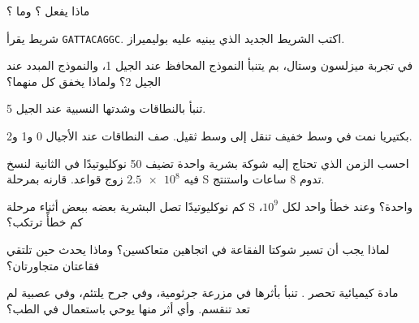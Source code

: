 \begin{exercise}[$\star$]\label{exo:g11:dna-replication:4}
ماذا يفعل ؟ وما ؟
\end{exercise}

\begin{exercise}[$\star$]\label{exo:g11:dna-replication:5}
شريط يقرأ \texttt{GATTACAGGC}. اكتب الشريط الجديد الذي يبنيه عليه
بوليميراز.
\end{exercise}

\begin{exercise}[$\star\star$]\label{exo:g11:dna-replication:6}
في تجربة ميزلسون وستال، بم يتنبأ النموذج المحافظ عند الجيل 1،
والنموذج المبدد عند الجيل 2؟ ولماذا يخفق كل منهما؟
\end{exercise}

\begin{exercise}[$\star\star$]\label{exo:g11:dna-replication:7}
تنبأ بالنطاقات وشدتها النسبية عند الجيل 5.
\end{exercise}

\begin{exercise}[$\star\star$]\label{exo:g11:dna-replication:8}
بكتيريا نمت في وسط خفيف تنقل إلى وسط ثقيل. صف النطاقات عند الأجيال 0
و1 و2.
\end{exercise}

\begin{exercise}[$\star\star$]\label{exo:g11:dna-replication:9}
احسب الزمن الذي تحتاج إليه شوكة بشرية واحدة تضيف 50 نوكليوتيدًا في
الثانية لنسخ  فيه $\num{2.5e8}$ زوج قواعد. قارنه بمرحلة S تدوم 8
ساعات واستنتج.
\end{exercise}

\begin{exercise}[$\star\star$]\label{exo:g11:dna-replication:10}
كم نوكليوتيدًا تصل  البشرية بعضه ببعض أثناء مرحلة S واحدة؟ وعند
خطأ واحد لكل $10^9$، كم خطأً ترتكب؟
\end{exercise}

\begin{exercise}[$\star\star$]\label{exo:g11:dna-replication:11}
لماذا يجب أن تسير شوكتا الفقاعة في اتجاهين متعاكسين؟ وماذا يحدث حين
تلتقي فقاعتان متجاورتان؟
\end{exercise}

\begin{exercise}[$\star\star\star$]\label{exo:g11:dna-replication:12}
مادة كيميائية تحصر . تنبأ بأثرها في مزرعة جرثومية، وفي
جرح يلتئم، وفي  عصبية لم تعد تنقسم. وأي أثر منها يوحي باستعمال في
الطب؟
\end{exercise}

